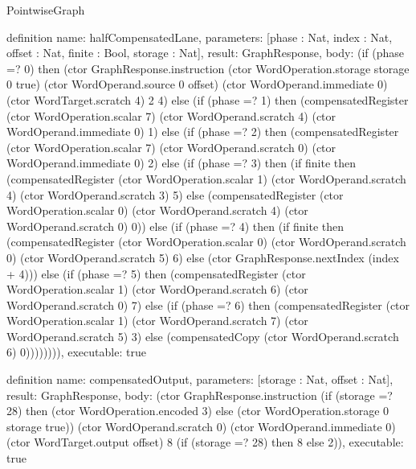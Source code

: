 \begin{lexlean}{PointwiseGraph}
\begin{semanticmodule}
definition{
  name: halfCompensatedLane,
  parameters: [phase : Nat, index : Nat, offset : Nat, finite : Bool, storage : Nat],
  result: GraphResponse,
  body: (if (phase =? 0) then (ctor GraphResponse.instruction (ctor WordOperation.storage storage 0 true) (ctor WordOperand.source 0 offset) (ctor WordOperand.immediate 0) (ctor WordTarget.scratch 4) 2 4)
      else (if (phase =? 1) then (compensatedRegister (ctor WordOperation.scalar 7) (ctor WordOperand.scratch 4) (ctor WordOperand.immediate 0) 1)
      else (if (phase =? 2) then (compensatedRegister (ctor WordOperation.scalar 7) (ctor WordOperand.scratch 0) (ctor WordOperand.immediate 0) 2)
      else (if (phase =? 3) then (if finite then (compensatedRegister (ctor WordOperation.scalar 1) (ctor WordOperand.scratch 4) (ctor WordOperand.scratch 3) 5) else (compensatedRegister (ctor WordOperation.scalar 0) (ctor WordOperand.scratch 4) (ctor WordOperand.scratch 0) 0))
      else (if (phase =? 4) then (if finite then (compensatedRegister (ctor WordOperation.scalar 0) (ctor WordOperand.scratch 0) (ctor WordOperand.scratch 5) 6) else (ctor GraphResponse.nextIndex (index + 4)))
      else (if (phase =? 5) then (compensatedRegister (ctor WordOperation.scalar 1) (ctor WordOperand.scratch 6) (ctor WordOperand.scratch 0) 7)
      else (if (phase =? 6) then (compensatedRegister (ctor WordOperation.scalar 1) (ctor WordOperand.scratch 7) (ctor WordOperand.scratch 5) 3)
      else (compensatedCopy (ctor WordOperand.scratch 6) 0)))))))),
  executable: true
}

definition{
  name: compensatedOutput,
  parameters: [storage : Nat, offset : Nat],
  result: GraphResponse,
  body: (ctor GraphResponse.instruction (if (storage =? 28) then (ctor WordOperation.encoded 3) else (ctor WordOperation.storage 0 storage true)) (ctor WordOperand.scratch 0) (ctor WordOperand.immediate 0) (ctor WordTarget.output offset) 8 (if (storage =? 28) then 8 else 2)),
  executable: true
}


\end{semanticmodule}
\end{lexlean}
